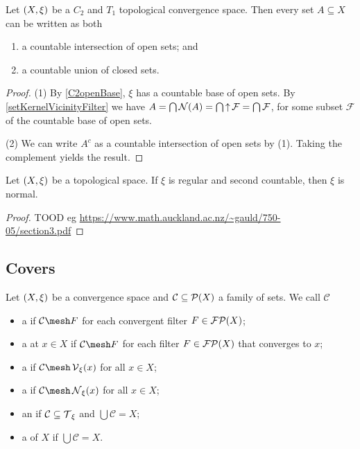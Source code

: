 \begin{lemma} \label{AnySetCountableIntersectionOfOpenSets}
Let $\left( X,\xi \right)$ be a $C_2$ and $T_1$ topological convergence space. Then every set $A\subseteq X$ can be written as both
\begin{enumerate}
\item a countable intersection of open sets; and
\item a countable union of closed sets.
\end{enumerate}
\end{lemma}
\begin{proof}
(1) By \ref{C2openBase}, $\xi$ has a countable base of open sets. By \ref{setKernelVicinityFilter} we have $A = \bigcap \operatorname{\mathcal{N}}(A) = \bigcap \operatorname{\uparrow} \mathcal{F} = \bigcap \mathcal{F}$, for some subset $\mathcal{F}$ of the countable base of open sets.

(2) We can write $A^c$ as a countable intersection of open sets by (1). Taking the complement yields the result.
\end{proof}


\begin{proposition} \label{countableRegularityImpliesNormality}
Let $\left( X,\xi \right)$ be a topological space. If $\xi$ is regular and second countable, then $\xi$ is normal.
\end{proposition}
\begin{proof}
TOOD eg \url{https://www.math.auckland.ac.nz/~gauld/750-05/section3.pdf}
\end{proof}


\subsection{Covers}
\begin{definition}
Let $\left( X,\xi \right)$ be a convergence space and $\mathcal{C}\subseteq \operatorname{\mathcal{P}}(X)$ a family of sets. We call $\mathcal{C}$ 
\begin{itemize}
\item a  if $\mathcal{C}\mesh F$ for each convergent filter $F\in\operatorname{\mathcal{FP}}(X)$;
\item a  at $x\in X$ if $\mathcal{C}\mesh F$ for each filter $F\in\operatorname{\mathcal{FP}}(X)$ that converges to $x$;
\item a  if $\mathcal{C}\mesh \vicinity_\xi(x)$ for all $x\in X$;
\item a  if $\mathcal{C}\mesh \neighbourhood_\xi(x)$ for all $x\in X$;
\item an  if $\mathcal{C} \subseteq \operatorname{\mathcal{T}}_\xi$ and $\bigcup \mathcal{C} = X$;
\item a  of $X$ if $\bigcup \mathcal{C} = X$.
\end{itemize}
\end{definition}

